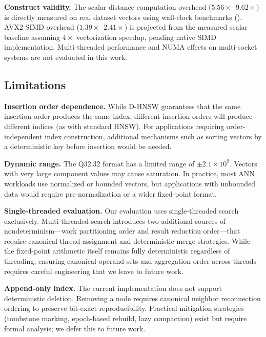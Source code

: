\documentclass[10pt,journal]{IEEEtran}
\newcommand{\dhnsw}{\textsc{D-HNSW}}
\newcommand{\hnsw}{\textsc{HNSW}}
\begin{document}
\textbf{Construct validity.} The scalar distance computation overhead ($5.56\times$--$9.62\times$) is directly measured on real dataset vectors using wall-clock benchmarks (). AVX2 SIMD overhead ($1.39\times$--$2.41\times$) is projected from the measured scalar baseline assuming $4\times$ vectorization speedup, pending native SIMD implementation. Multi-threaded performance and NUMA effects on multi-socket systems are not evaluated in this work.

\subsection{Limitations}

\textbf{Insertion order dependence.} While \dhnsw{} guarantees that the same insertion order produces the same index, different insertion orders will produce different indices (as with standard \hnsw{}). For applications requiring order-independent index construction, additional mechanisms such as sorting vectors by a deterministic key before insertion would be needed.

\textbf{Dynamic range.} The Q32.32 format has a limited range of $\pm 2.1 \times 10^9$. Vectors with very large component values may cause saturation. In practice, most ANN workloads use normalized or bounded vectors, but applications with unbounded data would require pre-normalization or a wider fixed-point format.

\textbf{Single-threaded evaluation.} Our evaluation uses single-threaded search exclusively. Multi-threaded search introduces two additional sources of nondeterminism---work partitioning order and result reduction order---that require canonical thread assignment and deterministic merge strategies. While the fixed-point arithmetic itself remains fully deterministic regardless of threading, ensuring canonical operand sets and aggregation order across threads requires careful engineering that we leave to future work.

\textbf{Append-only index.} The current implementation does not support deterministic deletion. Removing a node requires canonical neighbor reconnection ordering to preserve bit-exact reproducibility. Practical mitigation strategies (tombstone marking, epoch-based rebuild, lazy compaction) exist but require formal analysis; we defer this to future work.

\end{document}
